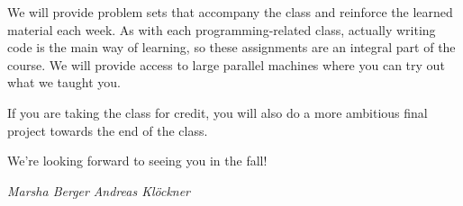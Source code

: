 We will provide problem sets that accompany the class and reinforce
the learned material each week. As with each programming-related
class, actually writing code is the main way of learning, so these
assignments are an integral part of the course. We will provide
access to large parallel machines where you can try out what we taught
you.

If you are taking the class for credit, you will also do a more
ambitious final project towards the end of the class.

We're looking forward to seeing you in the fall!

\hfill \emph{Marsha Berger} \hfill \emph{Andreas Klöckner}
